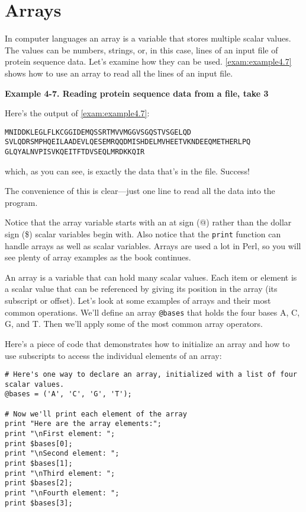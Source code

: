 \section{Arrays}
In computer languages an array is a variable that stores multiple scalar values. The values can be numbers, strings, or, in this case, lines of an input file of protein sequence data. Let's examine how they can be used. \autoref{exam:example4.7} shows how to use an array to read all the lines of an input file.

\textbf{Example 4-7. Reading protein sequence data from a file, take 3}



Here's the output of \autoref{exam:example4.7}:

\begin{lstlisting}
MNIDDKLEGLFLKCGGIDEMQSSRTMVVMGGVSGQSTVSGELQD
SVLQDRSMPHQEILAADEVLQESEMRQQDMISHDELMVHEETVKNDEEQMETHERLPQ
GLQYALNVPISVKQEITFTDVSEQLMRDKKQIR
\end{lstlisting}

which, as you can see, is exactly the data that's in the file. Success!

The convenience of this is clear—just one line to read all the data into the program. 

Notice that the array variable starts with an at sign (@) rather than the dollar sign (\$) scalar variables begin with. Also notice that the \verb|print| function can handle arrays as well as scalar variables. Arrays are used a lot in Perl, so you will see plenty of array examples as the book continues.  

An array is a variable that can hold many scalar values. Each item or element is a scalar value that can be referenced by giving its position in the array (its subscript or offset). Let's look at some examples of arrays and their most common operations. We'll define an array \verb|@bases| that holds the four bases A, C, G, and T. Then we'll apply some of the most common array operators.

Here's a piece of code that demonstrates how to initialize an array and how to use subscripts to access the individual elements of an array: 

\begin{lstlisting}
# Here's one way to declare an array, initialized with a list of four scalar values.
@bases = ('A', 'C', 'G', 'T');

# Now we'll print each element of the array
print "Here are the array elements:";
print "\nFirst element: ";
print $bases[0];
print "\nSecond element: ";
print $bases[1];
print "\nThird element: ";
print $bases[2];
print "\nFourth element: ";
print $bases[3];
\end{lstlisting}


